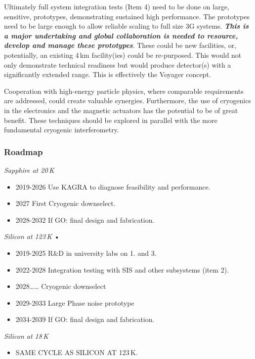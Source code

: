 Ultimately full system integration tests (Item 4) need to be done on large, sensitive, prototypes, demonstrating sustained high performance.  The prototypes need to be large enough to allow reliable scaling to full size 3G systems.  \textit{\textbf{This is a major undertaking and global collaboration is needed to resource, develop and manage these prototypes}}.  These could be new facilities, or,  potentially, an existing 4\,km facility(ies) could be re-purposed.  This would not only demonstrate technical readiness but would produce detector(s) with a significantly extended range.  This is effectively the Voyager concept.

Cooperation with high-energy particle physics, where comparable requirements are addressed, could create valuable synergies. Furthermore, the use of cryogenics in the electronics and the magnetic actuators\cite{cryo:OSEM} has the potential to be of great benefit. These techniques should be explored in parallel with the more fundamental cryogenic interferometry.

\subsubsection{Roadmap}

\textit{Sapphire at 20\,K}


\begin{itemize}
\item  2019-2026  	Use KAGRA to diagnose  feasibility and performance.
\item  2027  		First Cryogenic downselect.  
\item  2028-2032  		If GO:  final design and fabrication.
\end{itemize}



\textit{Silicon at 	123\,K}
•  \begin{itemize}
\item 2019-2025  	R\&D in university labs on 1. and 3.
\item 2022-2028	Integration testing with SIS and other subsystems  (item 2).
\item 2028……  	Cryogenic downselect
\item 2029-2033	Large  Phase noise prototype
\item 2034-2039		If GO:  final design and fabrication.
\end{itemize}



\textit{Silicon at 	18\,K}
\begin{itemize}
\item SAME CYCLE AS SILICON AT 123\,K.
\end{itemize}

